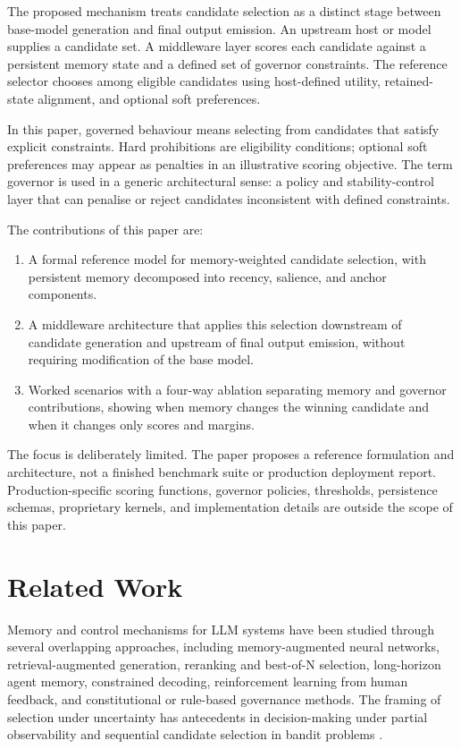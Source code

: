 \documentclass[11pt]{article}
\begin{document}
The proposed mechanism treats candidate selection as a distinct stage between base-model generation and final output emission. An upstream host or model supplies a candidate set. A middleware layer scores each candidate against a persistent memory state and a defined set of governor constraints. The reference selector chooses among eligible candidates using host-defined utility, retained-state alignment, and optional soft preferences.

In this paper, governed behaviour means selecting from candidates that satisfy explicit constraints. Hard prohibitions are eligibility conditions; optional soft preferences may appear as penalties in an illustrative scoring objective. The term governor is used in a generic architectural sense: a policy and stability-control layer that can penalise or reject candidates inconsistent with defined constraints.

The contributions of this paper are:
\begin{enumerate}
    \item A formal reference model for memory-weighted candidate selection, with persistent memory decomposed into recency, salience, and anchor components.
    \item A middleware architecture that applies this selection downstream of candidate generation and upstream of final output emission, without requiring modification of the base model.
    \item Worked scenarios with a four-way ablation separating memory and governor contributions, showing when memory changes the winning candidate and when it changes only scores and margins.
\end{enumerate}

The focus is deliberately limited. The paper proposes a reference formulation and architecture, not a finished benchmark suite or production deployment report. Production-specific scoring functions, governor policies, thresholds, persistence schemas, proprietary kernels, and implementation details are outside the scope of this paper.

\section{Related Work}

Memory and control mechanisms for LLM systems have been studied through several overlapping approaches, including memory-augmented neural networks, retrieval-augmented generation, reranking and best-of-N selection, long-horizon agent memory, constrained decoding, reinforcement learning from human feedback, and constitutional or rule-based governance methods. The framing of selection under uncertainty has antecedents in decision-making under partial observability \citep{kaelbling1998planning,sutton2018reinforcement} and sequential candidate selection in bandit problems \citep{bubeck2012regret}.
\end{document}
